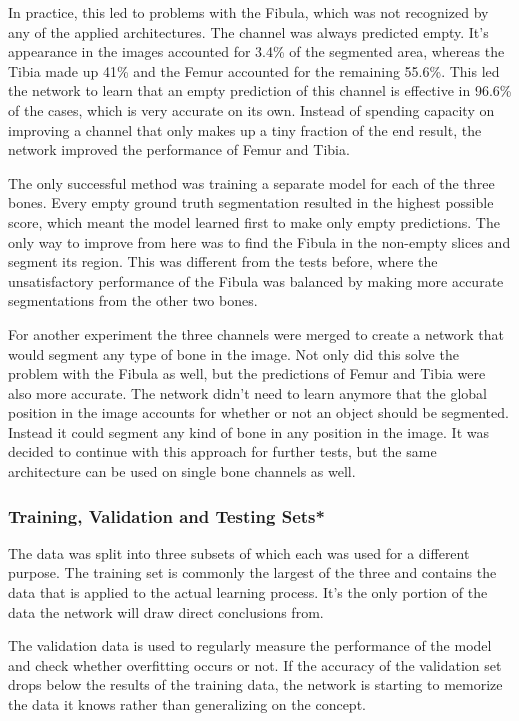 In practice, this led to problems with the Fibula, which was not recognized by any of the applied architectures. The channel was always predicted empty. It's appearance in the images accounted for 3.4\% of the segmented area, whereas the Tibia made up 41\% and the Femur accounted for the remaining 55.6\%. This led the network to learn that an empty prediction of this channel is effective in 96.6\% of the cases, which is very accurate on its own. Instead of spending capacity on improving a channel that only makes up a tiny fraction of the end result, the network improved the performance of Femur and Tibia.

The only successful method was training a separate model for each of the three bones. Every empty ground truth segmentation resulted in the highest possible score, which meant the model learned first to make only empty predictions. The only way to improve from here was to find the Fibula in the non-empty slices and segment its region. This was different from the tests before, where the unsatisfactory performance of the Fibula was balanced by making more accurate segmentations from the other two bones.

For another experiment the three channels were merged to create a network that would segment any type of bone in the image. Not only did this solve the problem with the Fibula as well, but the predictions of Femur and Tibia were also more accurate. The network didn't need to learn anymore that the global position in the image accounts for whether or not an object should be segmented. Instead it could segment any kind of bone in any position in the image. It was decided to continue with this approach for further tests, but the same architecture can be used on single bone channels as well. 

\subsubsection{Training, Validation and Testing Sets*}

The data was split into three subsets of which each was used for a different purpose. The training set is commonly the largest of the three and contains the data that is applied to the actual learning process. It's the only portion of the data the network will draw direct conclusions from. 

The validation data is used to regularly measure the performance of the model and check whether overfitting occurs or not. If the accuracy of the validation set drops below the results of the training data, the network is starting to memorize the data it knows rather than generalizing on the concept. 

